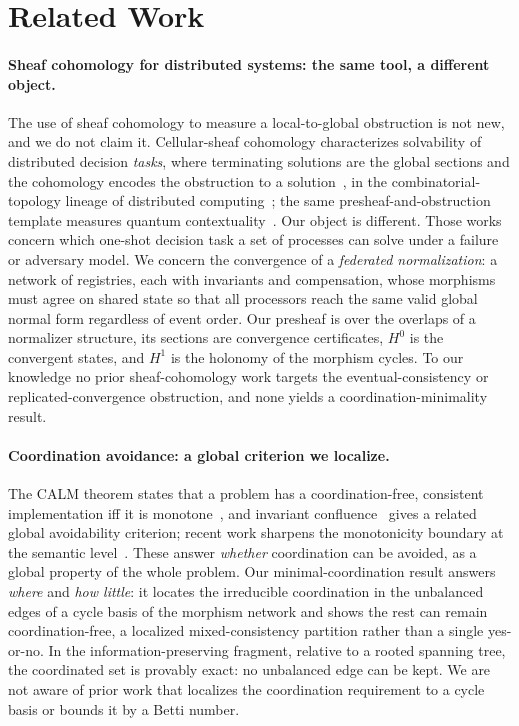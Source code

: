 \documentclass[11pt,a4paper]{article}
\theoremstyle{plain}
\theoremstyle{definition}
\theoremstyle{remark}
\newcommand{\Hz}{H^0}
\newcommand{\Ho}{H^1}
\renewcommand{\_}{\origunderscore\allowbreak}
\begin{document}
\section{Related Work}
\label{sec:related}

\paragraph{Sheaf cohomology for distributed systems: the same tool, a different object.}
The use of sheaf cohomology to measure a local-to-global obstruction is not new, and we do not claim
it. Cellular-sheaf cohomology characterizes solvability of distributed decision \emph{tasks}, where
terminating solutions are the global sections and the cohomology encodes the obstruction to a
solution~\cite{felber2025sheaftasks}, in the combinatorial-topology lineage of distributed
computing~\cite{herlihy2013topology}; the same presheaf-and-obstruction template measures quantum
contextuality~\cite{abramsky2011sheaf}. Our object is different. Those works concern which one-shot
decision task a set of processes can solve under a failure or adversary model. We concern the
convergence of a \emph{federated normalization}: a network of registries, each with invariants and
compensation, whose morphisms must agree on shared state so that all processors reach the same valid
global normal form regardless of event order. Our presheaf is over the overlaps of a normalizer
structure, its sections are convergence certificates, $\Hz$ is the convergent states, and $\Ho$ is
the holonomy of the morphism cycles. To our knowledge no prior sheaf-cohomology work targets the
eventual-consistency or replicated-convergence obstruction, and none yields a coordination-minimality
result.

\paragraph{Coordination avoidance: a global criterion we localize.}
The CALM theorem states that a problem has a coordination-free, consistent implementation iff it is
monotone~\cite{hellerstein2010declarative, ameloot2013relational}, and invariant
confluence~\cite{bailis2014coordination} gives a related global avoidability criterion; recent work
sharpens the monotonicity boundary at the semantic level~\cite{completecalm2026,
coordfree2025}. These answer \emph{whether} coordination can be avoided, as a global property of the
whole problem. Our minimal-coordination result answers \emph{where} and \emph{how little}: it locates
the irreducible coordination in the unbalanced edges of a cycle basis of the morphism network and
shows the rest can remain coordination-free, a localized mixed-consistency partition rather than a
single yes-or-no. In the information-preserving fragment, relative to a rooted spanning tree, the
coordinated set is provably exact: no unbalanced edge can be kept. We are not aware of prior work
that localizes the coordination requirement to a cycle basis or bounds it by a Betti number.
\end{document}
